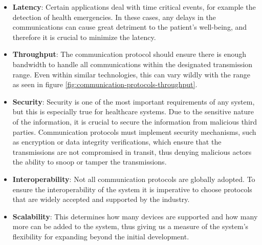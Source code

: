 \begin{itemize}
    \item \textbf{Latency}: Certain applications deal with time critical events, for example the detection of health emergencies. In these cases, any delays in the communications can cause great detriment to the patient's well-being, and therefore it is crucial to minimize the latency.
    \item \textbf{Throughput}: The communication protocol should ensure there is enough bandwidth to handle all communications within the designated transmission range. Even within similar technologies, this can vary wildly with the range as seen in figure \ref{fig:communication-protocols-throughput}. 
    \item \textbf{Security}: Security is one of the most important requirements of any system, but this is especially true for healthcare systems. Due to the sensitive nature of the information, it is crucial to secure the information from malicious third parties. Communication protocols must implement security mechanisms, such as encryption or data integrity verifications, which ensure that the transmissions are not compromised in transit, thus denying malicious actors the ability to snoop or tamper the transmissions.
    \item \textbf{Interoperability}: Not all communication protocols are globally adopted. To ensure the interoperability of the system it is imperative to choose protocols that are widely accepted and supported by the industry. %
    \item \textbf{Scalability}: This determines how many devices are supported and how many more can be added to the system, thus giving us a measure of the system's flexibility for expanding beyond the initial development. 
\end{itemize}

